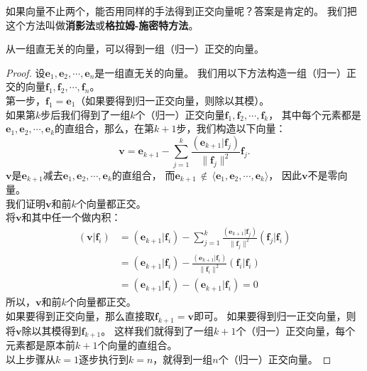 \documentclass[12pt,UTF8,fontset=none]{ctexbook}
\begin{document}
如果向量不止两个，能否用同样的手法得到正交向量呢？答案是肯定的。
我们把这个方法叫做\textbf{消影法}或\textbf{格拉姆-施密特方法}。

\begin{pp}\label{pp:7_5}
    从一组直无关的向量，可以得到一组（归一）正交的向量。
\end{pp}

\begin{proof} %
    设$\mathbf{e}_1, \mathbf{e}_2, \cdots , \mathbf{e}_n$是一组直无关的向量。
    我们用以下方法构造一组（归一）正交的向量$\mathbf{f}_1, \mathbf{f}_2, \cdots , \mathbf{f}_n$。\\
    第一步，$\mathbf{f}_1 = \mathbf{e}_1$（如果要得到归一正交向量，则除以其模）。\\
    如果第$k$步后我们得到了一组$k$个（归一）正交向量$\mathbf{f}_1, \mathbf{f}_2, \cdots , \mathbf{f}_k$，
    其中每个元素都是$\mathbf{e}_1, \mathbf{e}_2, \cdots , \mathbf{e}_k$的直组合，那么，在第$k+1$步，我们构造以下向量：
    $$ \mathbf{v} = \mathbf{e}_{k+1} - \sum_{j=1}^k \frac{(\mathbf{e}_{k+1}|\mathbf{f}_j)}{\|\mathbf{f}_j\|^2} \mathbf{f}_j.$$
    $ \mathbf{v}$是$\mathbf{e}_{k+1}$减去$\mathbf{e}_1, \mathbf{e}_2, \cdots , \mathbf{e}_{k}$的直组合，
    而$\mathbf{e}_{k+1}\,\notin \, \langle \mathbf{e}_1, \mathbf{e}_2, \cdots , \mathbf{e}_{k} \rangle$，
    因此$\mathbf{v}$不是零向量。\\
    我们证明$ \mathbf{v}$和前$k$个向量都正交。\\
    将$ \mathbf{v}$和其中任一个做内积：
    \begin{align*} 
        (\mathbf{v} | \mathbf{f}_i) &= (\mathbf{e}_{k+1} | \mathbf{f}_i) - \sum_{j=1}^k \frac{(\mathbf{e}_{k+1}|\mathbf{f}_j)}{\|\mathbf{f}_j\|^2} (\mathbf{f}_j | \mathbf{f}_i)  \\
        &= (\mathbf{e}_{k+1} | \mathbf{f}_i) - \frac{(\mathbf{e}_{k+1}|\mathbf{f}_i)}{\|\mathbf{f}_i\|^2} (\mathbf{f}_i | \mathbf{f}_i)  \\
        &= (\mathbf{e}_{k+1} | \mathbf{f}_i) - (\mathbf{e}_{k+1} | \mathbf{f}_i) = 0 
    \end{align*}
    所以，$\mathbf{v}$和前$k$个向量都正交。\\
    如果要得到正交向量，那么直接取$\mathbf{f}_{k+1} = \mathbf{v}$即可。
    如果要得到归一正交向量，则将$\mathbf{v}$除以其模得到$\mathbf{f}_{k+1}$。
    这样我们就得到了一组$k+1$个（归一）正交向量，每个元素都是原本前$k+1$个向量的直组合。\\
    以上步骤从$k=1$逐步执行到$k=n$，就得到一组$n$个（归一）正交向量。

\end{proof}
\end{document}
